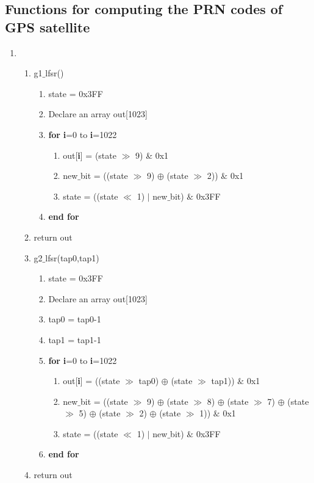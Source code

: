 \documentclass[journal,10pt,onecolumn]{article}
\begin{document}
\subsection{Functions for computing the PRN codes of GPS satellite}
\begin{enumerate}
    \item 
    \begin{enumerate}
    \item g1$\_$lfsr()
    \begin{enumerate}
    \item[] state = 0x3FF
    \item[] Declare an array out[1023]
    \item[] \textbf{for} \textbf{i}=0 to \textbf{i}=1022
        \begin{enumerate}
            \item[] out[\textbf{i}] = (state $\gg$ 9) \& 0x1 
            \item[] new$\_$bit = ((state $\gg$ 9) $\oplus$ (state $\gg$ 2)) $\&$ 0x1
            \item[] state = ((state $\ll$ 1) $\vert$  new$\_$bit) $\&$ 0x3FF
        \end{enumerate}
    \item[] \textbf{end for}
    \end{enumerate}
    \item[] return out
    

    \item g2$\_$lfsr(tap0,tap1)
    \begin{enumerate}
        \item[] state = 0x3FF
        \item[] Declare an array out[1023]
        \item[] tap0 = tap0-1
        \item[] tap1 = tap1-1 
        \item[] \textbf{for} \textbf{i}=0 to \textbf{i}=1022
        \begin{enumerate}
            \item[] out[\textbf{i}] = ((state $\gg$ tap0) $\oplus$ (state $\gg$ tap1)) $\&$ 0x1
            \item[] new$\_$bit =  ((state $\gg$ 9) $\oplus$ (state $\gg$ 8) $\oplus$
            (state $\gg$ 7) $\oplus$ (state $\gg$ 5) $\oplus$
            (state $\gg$ 2) $\oplus$ (state $\gg$ 1)) $\&$ 0x1
            \item[] state = ((state $\ll$ 1) $\vert$ new$\_$bit) $\&$ 0x3FF
        \end{enumerate}
        \item[] \textbf{end for}
    \end{enumerate}
    \item[] return out





\end{enumerate}
\end{enumerate}
\end{document}

